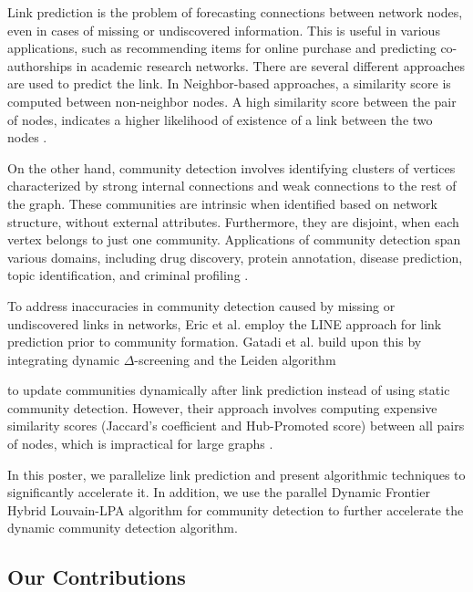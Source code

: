 Link prediction is the problem of forecasting connections between network nodes, even in cases of missing or undiscovered information. This is useful in various applications, such as recommending items for online purchase and predicting co-authorships in academic research networks. There are several different approaches are used to predict the link. In Neighbor-based approaches, a similarity score is computed between non-neighbor nodes. A high similarity score between the pair of nodes, indicates a higher likelihood of existence of a link between the two nodes \cite{gatadi2023lpcd, wang2014link}.

On the other hand, community detection involves identifying clusters of vertices characterized by strong internal connections and weak connections to the rest of the graph. These communities are intrinsic when identified based on network structure, without external attributes. Furthermore, they are disjoint, when each vertex belongs to just one community. Applications of community detection span various domains, including drug discovery, protein annotation, disease prediction, topic identification, and criminal profiling \cite{com-gregory10}.

To address inaccuracies in community detection caused by missing or undiscovered links in networks, Eric et al. \cite{de2021enriching} employ the LINE approach for link prediction prior to community formation. Gatadi et al. \cite{gatadi2023lpcd} build upon this by integrating dynamic $\Delta$-screening \cite{com-zarayeneh21} and the Leiden algorithm to update communities dynamically after link prediction instead of using static community detection. However, their approach involves computing expensive similarity scores (Jaccard's coefficient and Hub-Promoted score) between all pairs of nodes, which is impractical for large graphs \cite{gatadi2023lpcd}.

In this poster, we parallelize link prediction and present algorithmic techniques to significantly accelerate it. In addition, we use the parallel Dynamic Frontier Hybrid Louvain-LPA algorithm for community detection to further accelerate the dynamic community detection algorithm.




\subsection{Our Contributions}

